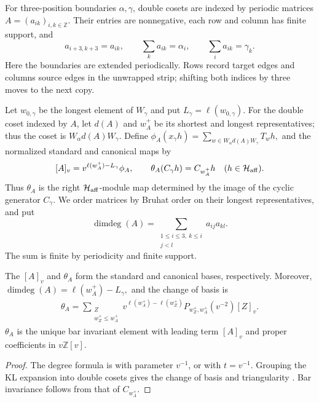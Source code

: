 \documentclass[a4paper,11pt]{amsart}
\numberwithin{equation}{subsection}
\theoremstyle{plain}
\theoremstyle{definition}
\theoremstyle{remark}
\begin{document}
\begin{definition}\label{def:schur-bases}
For three-position boundaries $\alpha,\gamma$, double cosets
are indexed by periodic matrices $A=(a_{ik})_{i,k\in\mathbb Z}$.
Their entries are nonnegative, each row and column has finite
support, and
\[
a_{i+3,k+3}=a_{ik},\qquad
\sum_k a_{ik}=\alpha_i,\qquad
\sum_i a_{ik}=\gamma_k.
\]
Here the boundaries are extended periodically. Rows record
target edges and columns source edges in the unwrapped strip;
shifting both indices by three moves to the next copy.

Let $w_{0,\gamma}$ be the longest element of $W_\gamma$ and put
$L_\gamma=\ell(w_{0,\gamma})$. For the double coset indexed by $A$,
let $d(A)$ and $w_A^+$ be its shortest and longest representatives;
thus the coset is $W_\alpha d(A)W_\gamma$. Define
$\phi_A(x_\gamma h)=\sum_{w\in W_\alpha d(A)W_\gamma}T_wh,$
and the normalized standard and canonical maps by
\[
[A]_v=v^{\ell(w_A^+)-L_\gamma}\phi_A,\qquad
\theta_A(C_\gamma h)=C_{w_A^+}h
\quad(h\in\mathcal H_{\rm aff}).
\]
Thus $\theta_A$ is the right $\mathcal H_{\rm aff}$-module map
determined by the image of the cyclic generator $C_\gamma$.
We order matrices by Bruhat order on their longest
representatives, and put
\[
\operatorname{dimdeg}(A)=
\sum_{\substack{1\le i\le3,\ k\le i\\j<l}}a_{ij}a_{kl}.
\]
The sum is finite by periodicity and finite support.
\end{definition}

\begin{lemma}\label{lem:affine-schur-dictionary}
The $[A]_v$ and $\theta_A$ form the standard and canonical
bases, respectively. Moreover,
$\operatorname{dimdeg}(A)=\ell(w_A^+)-L_\gamma,$
and the change of basis is
\begin{gather}\label{eq:exact-schur-dictionary}
\theta_A=\sum_{\substack{Z\\w_Z^+\le w_A^+}}
v^{\ell(w_A^+)-\ell(w_Z^+)}
P_{w_Z^+,w_A^+}(v^{-2})[Z]_v.
\end{gather}
$\theta_A$ is the unique bar invariant element
with leading term $[A]_v$ and proper coefficients in
$v\mathbb Z[v]$.
\end{lemma}

\begin{proof}
The degree formula is \cite[(2.0.3)]{DuFu} with parameter
$v^{-1}$, or \cite[Lemma~7.2]{Cui} with $t=v^{-1}$.
Grouping the KL expansion into double cosets gives the
change of basis and triangularity
\cite[Lemma~3.1, Theorem~3.1, (3.4)--(3.5)]{Cui}.
Bar invariance follows from that of $C_{w_A^+}$.
\end{proof}
\end{document}
